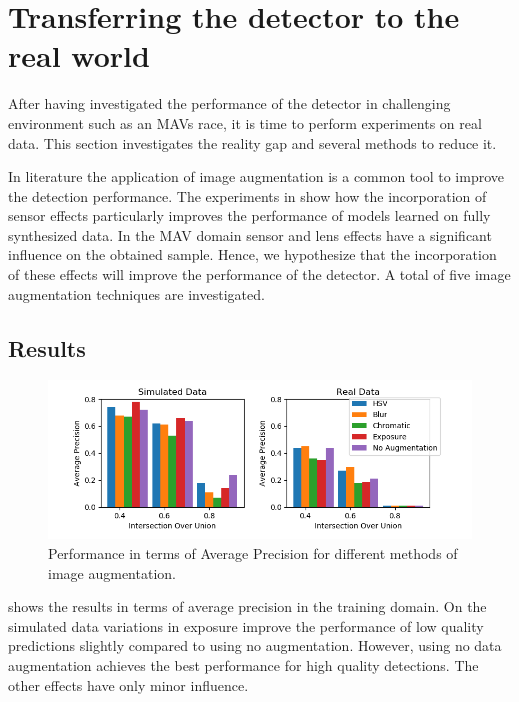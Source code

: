 \section{Transferring the detector to the real world}

After having investigated the performance of the detector in challenging environment such as an \acp{MAV} race, it is time to perform experiments on real data. This section investigates the reality gap and several methods to reduce it.

In literature \cite{Krizhevsky2012a,Howard2013,Redmon,Liu} the application of image augmentation is a common tool to improve the detection performance. The experiments in \cite{Carlson2018} show how the incorporation of sensor effects particularly improves the performance of models learned on fully synthesized data. In the \ac{MAV} domain sensor and lens effects have a significant influence on the obtained sample. Hence, we hypothesize that the incorporation of these effects will improve the performance of the detector. A total of  five image augmentation techniques are investigated.

\subsection{Results}

\begin{figure}[htbp]
	\centering
	\includegraphics[width=\textwidth]{fig/pp_bar}
	\caption{Performance in terms of Average Precision for different methods  of image augmentation.}
	\label{fig:pp_bar}
\end{figure}

 shows the results in terms of average precision in the training domain. On the simulated data variations in exposure improve the performance of low quality predictions slightly compared to using no augmentation. However, using no data augmentation achieves the best performance for high quality detections. The other effects have only minor influence. 

